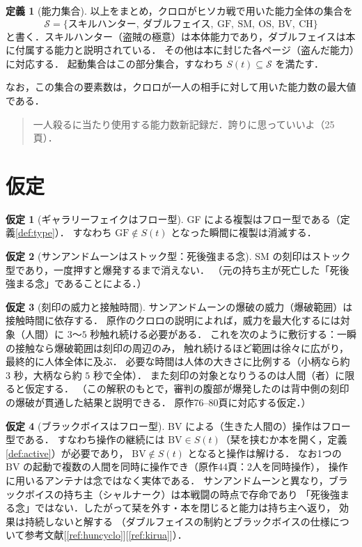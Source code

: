 \documentclass[a4paper,12pt]{jarticle}
\theoremstyle{definition}
\newtheorem{definition}{定義}
\newtheorem{assumption}{仮定}
\theoremstyle{plain}
\theoremstyle{definition}
\theoremstyle{remark}
\newcommand{\Act}{S}   %
\newcommand{\GF}{\mathrm{GF}}    %
\newcommand{\OS}{\mathrm{OS}}    %
\newcommand{\BV}{\mathrm{BV}}    %
\newcommand{\CH}{\mathrm{CH}}    %
\newcommand{\SM}{\mathrm{SM}}    %
\begin{document}
\begin{definition}[能力集合]\label{def:P}
以上をまとめ，クロロがヒソカ戦で用いた能力全体の集合を
\[
\mathcal{S}=\{\text{スキルハンター},\ \text{ダブルフェイス},\ \GF,\ \SM,\ \OS,\ \BV,\ \CH\}
\]
と書く．スキルハンター（盗賊の極意）は本体能力であり，ダブルフェイスは本に付属する能力と説明されている．
その他は本に封じた各ページ（盗んだ能力）に対応する．
起動集合はこの部分集合，すなわち $\Act(t)\subseteq\mathcal{S}$ を満たす．
\end{definition}

なお，この集合の要素数は，クロロが一人の相手に対して用いた能力数の最大値である．

\begin{quotation}
 一人殺るに当たり使用する能力数新記録だ．誇りに思っていいよ（25頁）． 
\end{quotation}

\section{仮定}

\begin{assumption}[ギャラリーフェイクはフロー型]\label{as:gf}
GF による複製はフロー型である（定義\ref{def:type}）．
すなわち $\GF\notin\Act(t)$ となった瞬間に複製は消滅する．
\end{assumption}

\begin{assumption}[サンアンドムーンはストック型：死後強まる念]\label{as:sm}
SM の刻印はストック型であり，一度押すと爆発するまで消えない．
（元の持ち主が死亡した「死後強まる念」であることによる．）
\end{assumption}

\begin{assumption}[刻印の威力と接触時間]\label{as:power}
サンアンドムーンの爆破の威力（爆破範囲）は接触時間に依存する．
原作のクロロの説明によれば，威力を最大化するには対象（人間）に $3$〜$5$ 秒触れ続ける必要がある．
これを次のように敷衍する：一瞬の接触なら爆破範囲は刻印の周辺のみ，
触れ続けるほど範囲は徐々に広がり，最終的に人体全体に及ぶ．
必要な時間は人体の大きさに比例する（小柄なら約 $3$ 秒，大柄なら約 $5$ 秒で全体）．
また刻印の対象となりうるのは人間（者）に限ると仮定する．
（この解釈のもとで，審判の腹部が爆発したのは背中側の刻印の爆破が貫通した結果と説明できる．
原作76--80頁に対応する仮定．）
\end{assumption}

\begin{assumption}[ブラックボイスはフロー型]\label{as:bv}
BV による（生きた人間の）操作はフロー型である．
すなわち操作の継続には $\BV\in\Act(t)$（栞を挟むか本を開く，定義\ref{def:active}）が必要であり，
$\BV\notin\Act(t)$ となると操作は解ける．
なお1つの $\BV$ の起動で複数の人間を同時に操作でき（原作44頁：2人を同時操作），
操作に用いるアンテナは念ではなく実体である．
サンアンドムーンと異なり，ブラックボイスの持ち主（シャルナーク）は本戦闘の時点で存命であり
「死後強まる念」ではない．したがって栞を外す・本を閉じると能力は持ち主へ返り，
効果は持続しないと解する
（ダブルフェイスの制約とブラックボイスの仕様について参考文献[\ref{ref:huncyclo}][\ref{ref:kirua}]）．
\end{assumption}
\end{document}
